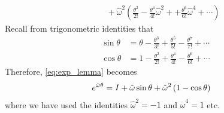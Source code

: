 \begin{solution}
\begin{align}
	&\quad + \hat{\omega}^2 \left( \frac{\theta^2}{2!} - \frac{\theta^4}{4!}\hat{\omega}^2 + + \frac{\theta^6}{6!}\hat{\omega}^4  + \cdots \right)
	\label{eq:exp_lemma}
	\end{align}
	Recall from trigonometric identities that 
	\begin{subequations}
		\begin{align}
		\sin \theta &= \theta - \frac{\theta^3}{3!}  + \frac{\theta^5}{5!} - \frac{\theta^7}{7!}  + \cdots  \nonumber \\
		\cos \theta		&= 1 - \frac{\theta^2}{2!} + \frac{\theta^4}{4!} - \frac{\theta^6}{6!} + \cdots
		\end{align}
	\end{subequations}
%
Therefore, \eqref{eq:exp_lemma} becomes 
%
	\begin{align}
		e^{\hat{\omega}\theta} &= I + \hat{\omega} \sin \theta + \hat{\omega}^2\left(1-\cos \theta \right)
	\end{align}
	where we have used the identities $\hat{\omega}^2 = -1$ and $\hat{\omega}^4 = 1$ etc.
\end{solution}


